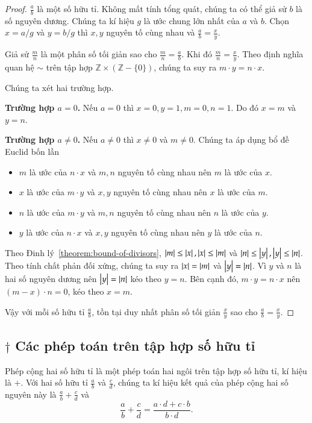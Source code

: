 \begin{proof}
	$\frac{a}{b}$ là một số hữu tỉ. Không mất tính tổng quát, chúng ta có thể giả sử $b$ là số nguyên dương. Chúng ta kí hiệu $g$ là ước chung lớn nhất của $a$ và $b$. Chọn $x = a/g$ và $y = b/g$ thì $x, y$ nguyên tố cùng nhau và $\frac{a}{b} = \frac{x}{y}$.

	Giả sử $\frac{m}{n}$ là một phân số tối giản sao cho $\frac{m}{n} = \frac{a}{b}$. Khi đó $\frac{m}{n} = \frac{x}{y}$. Theo định nghĩa quan hệ $\sim$ trên tập hợp $\mathbb{Z}\times (\mathbb{Z} - \{0\})$, chúng ta suy ra $m\cdot y = n\cdot x$.

	Chúng ta xét hai trường hợp.

	\textbf{Trường hợp $a = 0$.} Nếu $a = 0$ thì $x = 0, y = 1, m = 0, n = 1$. Do đó $x = m$ và $y = n$.

	\textbf{Trường hợp $a\ne 0$.} Nếu $a\ne 0$ thì $x\ne 0$ và $m\ne 0$. Chúng ta áp dụng bổ đề Euclid bốn lần
	\begin{itemize}
		\item $m$ là ước của $n\cdot x$ và $m, n$ nguyên tố cùng nhau nên $m$ là ước của $x$.
		\item $x$ là ước của $m\cdot y$ và $x, y$ nguyên tố cùng nhau nên $x$ là ước của $m$.
		\item $n$ là ước của $m\cdot y$ và $m, n$ nguyên tố cùng nhau nên $n$ là ước của $y$.
		\item $y$ là ước của $n\cdot x$ và $x, y$ nguyên tố cùng nhau nên $y$ là ước của $n$.
	\end{itemize}

	Theo Đinh lý~\ref{theorem:bound-of-divisors}, $\left\vert{m}\right\vert \leq \left\vert{x}\right\vert, \left\vert{x}\right\vert \leq \left\vert{m}\right\vert$ và $\left\vert{n}\right\vert \leq \left\vert{y}\right\vert, \left\vert{y}\right\vert \leq \left\vert{n}\right\vert$. Theo tính chất phản đối xứng, chúng ta suy ra $\left\vert{x}\right\vert = \left\vert{m}\right\vert$ và $\left\vert{y}\right\vert = \left\vert{n}\right\vert$. Vì $y$ và $n$ là hai số nguyên dương nên $\left\vert{y}\right\vert = \left\vert{n}\right\vert$ kéo theo $y = n$. Bên cạnh đó, $m\cdot y = n\cdot x$ nên $(m - x)\cdot n = 0$, kéo theo $x = m$.

	Vậy với mỗi số hữu tỉ $\frac{a}{b}$, tồn tại duy nhất phân số tối giản $\frac{x}{y}$ sao cho $\frac{a}{b} = \frac{x}{y}$.
\end{proof}

\subsection*{$\dagger$ Các phép toán trên tập hợp số hữu tỉ}

\begin{definition}
	Phép cộng hai số hữu tỉ là một phép toán hai ngôi trên tập hợp số hữu tỉ, kí hiệu là $+$. Với hai số hữu tỉ $\frac{a}{b}$ và $\frac{c}{d}$, chúng ta kí hiệu kết quả của phép cộng hai số nguyên này là $\frac{a}{b} + \frac{c}{d}$ và
	\[
		\frac{a}{b} + \frac{c}{d} = \frac{a\cdot d + c\cdot b}{b\cdot d}.
	\]
\end{definition}

